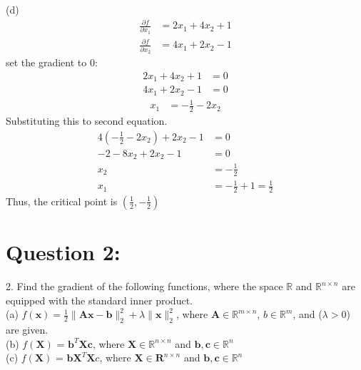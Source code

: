 \documentclass[a4paper,12pt]{article}
\newcommand{\R}{\mathbb{R}}
\begin{document}
(d)
\begin{align*}
    \frac{\partial f}{\partial x_1} &= 2x_1 + 4x_2 + 1 \\
    \frac{\partial f}{\partial x_2} &= 4x_1 + 2x_2 - 1
\end{align*}
set the gradient to 0:
\begin{align*}
    2x_1 + 4x_2 + 1 &= 0 \\
    4x_1 + 2x_2 - 1 &= 0
\end{align*}
\begin{align*}
    x_1 &= - \frac{1}{2} - 2x_2 
\end{align*}
Substituting this to second equation.
\begin{align*}
    4(- \frac{1}{2} - 2x_2) + 2x_2 - 1 &= 0 \\
    -2 - 8x_2 + 2x_2 - 1 &= 0 \\
    x_2 &= -\frac{1}{2} \\
    x_1 &= -\frac{1}{2} + 1 = \frac{1}{2}
\end{align*}
Thus, the critical point is \(\left( \frac{1}{2}, -\frac{1}{2} \right)\)





\section*{Question 2:}
2. Find the gradient of the following functions, where the space \(\R\) and \(\R^{n \times n}\) are equipped with the standard inner product. \\
(a) \(f(\bm{x}) = \frac{1}{2} \|\bm{A}\bm{x} - \bm{b}\|_2^2 + \lambda\|\bm{x}\|_2^2\), where \(\bm{A} \in \R^{m \times n}\), \(b \in \R^m\), and (\(\lambda > 0\)) are given. \\
(b) \(f(\bm{X})\) = \(\bm{b}^T\bm{X}\bm{c}\), where \(\bm{X} \in \R^{n \times n}\) and \(\bm{b}, \bm{c} \in \R^n\) \\
(c) \(f(\bm{X})\) = \(\bm{b}\bm{X}^T\bm{X}c\), where \(\bm{X} \in \bm{R}^{n \times n}\) and \(\bm{b}, \bm{c} \in \R^n\) 
\end{document}
